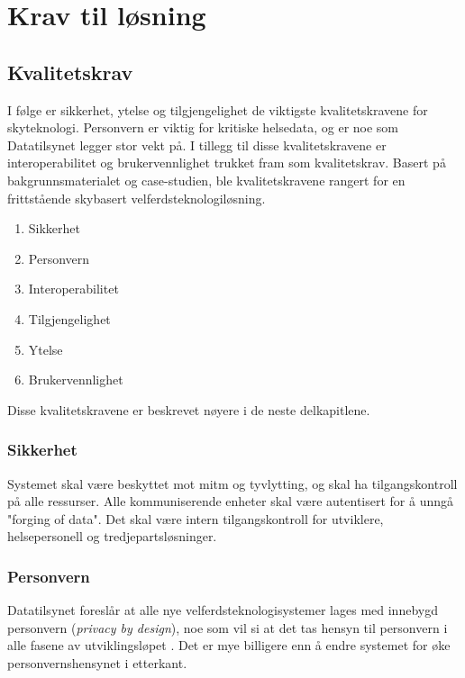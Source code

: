 \chapter{Krav til løsning}
\label{ch:requirements}


\section{Kvalitetskrav}

I følge \citet{softarch} er sikkerhet, ytelse og tilgjengelighet de viktigste kvalitetskravene for skyteknologi.
Personvern er viktig for kritiske helsedata, og er noe som Datatilsynet legger stor vekt på. I tillegg til disse kvalitetskravene
er interoperabilitet og brukervennlighet trukket fram som kvalitetskrav. Basert på bakgrunnsmaterialet og case-studien,
ble kvalitetskravene rangert for en frittstående skybasert velferdsteknologiløsning.

\begin{enumerate}
    \item Sikkerhet
    \item Personvern
    \item Interoperabilitet
    \item Tilgjengelighet
    \item Ytelse
    \item Brukervennlighet
\end{enumerate}

Disse kvalitetskravene er beskrevet nøyere i de neste delkapitlene.

\subsection{Sikkerhet}
Systemet skal være beskyttet mot \gls{mitm} og tyvlytting, og skal ha tilgangskontroll på alle ressurser.
Alle kommuniserende enheter skal være autentisert for å unngå "forging of data". %
Det skal være intern tilgangskontroll for utviklere, helsepersonell og tredjepartsløsninger.

\subsection{Personvern}
Datatilsynet foreslår at alle nye velferdsteknologisystemer lages med innebygd personvern (\textit{privacy by design}),
noe som vil si at det tas hensyn til personvern i alle fasene av utviklingsløpet \citep{datatilsynet_privacy}. Det er mye billigere
enn å endre systemet for øke personvernshensynet i etterkant.

